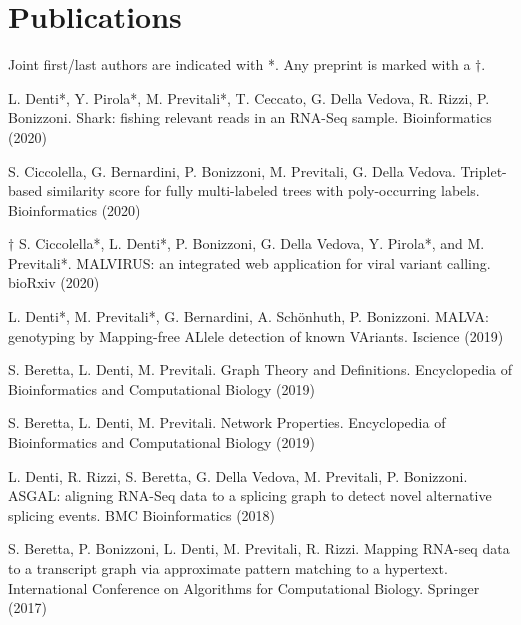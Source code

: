 \documentclass[letterpaper,11pt]{article}
\begin{document}
\section{Publications}
Joint first/last authors are indicated with *. Any preprint is marked with a \(\dagger\).
{\small
\begin{etaremune}
    \item L. Denti*, Y. Pirola*, M. Previtali*, T. Ceccato, G. Della Vedova, R. Rizzi, P. Bonizzoni. Shark: fishing relevant reads in an RNA-Seq sample. Bioinformatics (2020)
   
    \item S. Ciccolella, G. Bernardini, P. Bonizzoni, M. Previtali, G. Della Vedova. Triplet-based similarity score for fully multi-labeled trees with poly-occurring labels. Bioinformatics (2020)

    \item \(\dagger\) S. Ciccolella*, L. Denti*, P. Bonizzoni, G. Della Vedova, Y. Pirola*, and M. Previtali*. MALVIRUS: an integrated web application for viral variant calling. bioRxiv (2020)
   
    \item L. Denti*, M. Previtali*, G. Bernardini, A. Sch\"{o}nhuth, P. Bonizzoni. MALVA: genotyping by Mapping-free ALlele detection of known VAriants. Iscience (2019)
   
    \item S. Beretta, L. Denti, M. Previtali. Graph Theory and Definitions. Encyclopedia of Bioinformatics and Computational Biology (2019)
   
    \item S. Beretta, L. Denti, M. Previtali. Network Properties. Encyclopedia of Bioinformatics and Computational Biology (2019)
   
    \item L. Denti, R. Rizzi, S. Beretta, G. Della Vedova, M. Previtali, P. Bonizzoni. ASGAL: aligning RNA-Seq data to a splicing graph to detect novel alternative splicing events. BMC Bioinformatics (2018)
    
    \item S. Beretta, P. Bonizzoni, L. Denti, M. Previtali, R. Rizzi. Mapping RNA-seq data to a transcript graph via approximate pattern matching to a hypertext. International Conference on Algorithms for Computational Biology. Springer (2017)
\end{etaremune}
}
\end{document}

